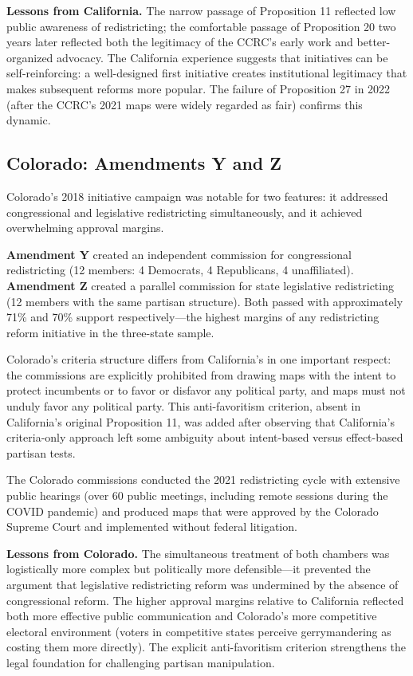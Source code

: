 \textbf{Lessons from California.} The narrow passage of Proposition 11 reflected low public awareness of redistricting; the comfortable passage of Proposition 20 two years later reflected both the legitimacy of the CCRC's early work and better-organized advocacy. The California experience suggests that initiatives can be self-reinforcing: a well-designed first initiative creates institutional legitimacy that makes subsequent reforms more popular. The failure of Proposition 27 in 2022 (after the CCRC's 2021 maps were widely regarded as fair) confirms this dynamic.

\subsection{Colorado: Amendments Y and Z}

Colorado's 2018 initiative campaign was notable for two features: it addressed congressional and legislative redistricting simultaneously, and it achieved overwhelming approval margins.

\textbf{Amendment Y} created an independent commission for congressional redistricting (12 members: 4 Democrats, 4 Republicans, 4 unaffiliated). \textbf{Amendment Z} created a parallel commission for state legislative redistricting (12 members with the same partisan structure). Both passed with approximately 71\% and 70\% support respectively---the highest margins of any redistricting reform initiative in the three-state sample.

Colorado's criteria structure differs from California's in one important respect: the commissions are explicitly prohibited from drawing maps with the intent to protect incumbents or to favor or disfavor any political party, and maps must not unduly favor any political party. This anti-favoritism criterion, absent in California's original Proposition 11, was added after observing that California's criteria-only approach left some ambiguity about intent-based versus effect-based partisan tests.

The Colorado commissions conducted the 2021 redistricting cycle with extensive public hearings (over 60 public meetings, including remote sessions during the COVID pandemic) and produced maps that were approved by the Colorado Supreme Court and implemented without federal litigation.

\textbf{Lessons from Colorado.} The simultaneous treatment of both chambers was logistically more complex but politically more defensible---it prevented the argument that legislative redistricting reform was undermined by the absence of congressional reform. The higher approval margins relative to California reflected both more effective public communication and Colorado's more competitive electoral environment (voters in competitive states perceive gerrymandering as costing them more directly). The explicit anti-favoritism criterion strengthens the legal foundation for challenging partisan manipulation.

